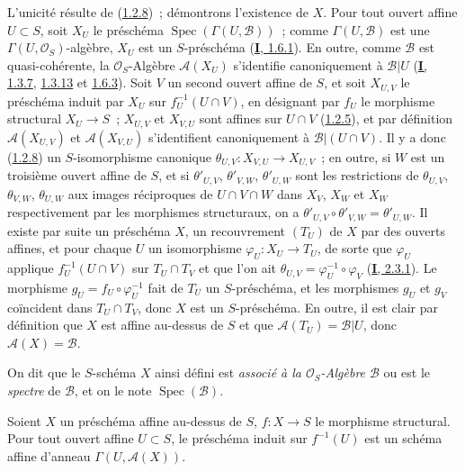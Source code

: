 L'unicité résulte de (\hyperref[II.1.2.8-fr]{1.2.8})~; démontrons l'existence
de $X$. Pour tout ouvert affine $U\subset S$, soit $X_U$ le préschéma
$\operatorname{Spec}(\Gamma(U,\mathcal{B}))$~; comme
$\Gamma(U,\mathcal{B})$ est une $\Gamma(U,\mathcal{O}_S)$-algèbre, $X_U$
est un $S$-préschéma (\hyperref[I.1.6.1-fr]{\textbf{I}, 1.6.1}). En outre, comme
$\mathcal{B}$ est quasi-cohérente, la $\mathcal{O}_S$-Algèbre
$\mathcal{A}(X_U)$ s'identifie canoniquement à $\mathcal{B}|U$
(\hyperref[I.1.3.7-fr]{\textbf{I}, 1.3.7},
\hyperref[I.1.3.13-fr]{1.3.13} et
\hyperref[I.1.6.3-fr]{1.6.3}). Soit $V$ un second ouvert affine de $S$, et
soit $X_{U,V}$ le préschéma induit par $X_U$ sur $f_U^{-1}(U\cap V)$, en
désignant par $f_U$ le morphisme structural $X_U\to S$~; $X_{U,V}$ et
$X_{V,U}$ sont affines sur $U\cap V$
(\hyperref[II.1.2.5-fr]{1.2.5}), et par définition $\mathcal{A}(X_{U,V})$
et $\mathcal{A}(X_{V,U})$ s'identifient canoniquement à
$\mathcal{B}|(U\cap V)$. Il y a donc
(\hyperref[II.1.2.8-fr]{1.2.8}) un $S$-isomorphisme canonique
$\theta_{U,V}:X_{V,U}\to X_{U,V}$~; en outre, si $W$ est un troisième
ouvert affine de $S$, et si $\theta'_{U,V}$, $\theta'_{V,W}$,
$\theta'_{U,W}$ sont les restrictions de $\theta_{U,V}$, $\theta_{V,W}$,
$\theta_{U,W}$ aux images réciproques de $U\cap V\cap W$ dans $X_V$,
$X_W$ et $X_W$ respectivement par les morphismes structuraux, on a
$\theta'_{U,V}\circ\theta'_{V,W}=\theta'_{U,W}$. Il existe par suite un
préschéma $X$, un recouvrement $(T_U)$ de $X$ par des ouverts affines, et
pour chaque $U$ un isomorphisme $\varphi_U:X_U\to T_U$, de sorte que
$\varphi_U$ applique $f_U^{-1}(U\cap V)$ sur $T_U\cap T_V$ et que l'on ait
$\theta_{U,V}=\varphi_U^{-1}\circ\varphi_V$
(\hyperref[I.2.3.1-fr]{\textbf{I}, 2.3.1}). Le morphisme
$g_U=f_U\circ\varphi_U^{-1}$ fait de $T_U$ un $S$-préschéma, et les
morphismes $g_U$ et $g_V$ coïncident dans $T_U\cap T_V$, donc $X$ est un
$S$-préschéma. En outre, il est clair par définition que $X$ est affine
au-dessus de $S$ et que $\mathcal{A}(T_U)=\mathcal{B}|U$, donc
$\mathcal{A}(X)=\mathcal{B}$.

On dit que le $S$-schéma $X$ ainsi défini est \emph{associé à la
$\mathcal{O}_S$-Algèbre $\mathcal{B}$} ou est le \emph{spectre} de
$\mathcal{B}$, et on le note $\operatorname{Spec}(\mathcal{B})$.

\begin{corollary}[1.3.2]
\label{II.1.3.2-fr}
Soient $X$ un préschéma affine au-dessus de $S$, $f:X\to S$ le morphisme
structural. Pour tout ouvert affine $U\subset S$, le préschéma induit sur
$f^{-1}(U)$ est un schéma affine d'anneau
$\Gamma(U,\mathcal{A}(X))$.
\end{corollary}

